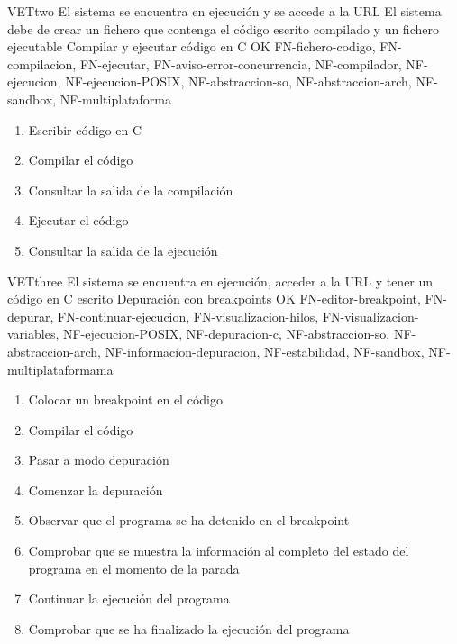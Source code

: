     \begin{testCase}{VET}{two}
        {El sistema se encuentra en ejecución y se accede a la URL}
        {El sistema debe de crear un fichero que contenga el código escrito compilado y un fichero ejecutable}
        {Compilar y ejecutar código en C}
        {OK}
        {FN-fichero-codigo, FN-compilacion, FN-ejecutar, FN-aviso-error-concurrencia, NF-compilador, NF-ejecucion, NF-ejecucion-POSIX, NF-abstraccion-so, NF-abstraccion-arch, NF-sandbox, NF-multiplataforma}
        \begin{enumerate}
            \item Escribir código en C
            \item Compilar el código
            \item Consultar la salida de la compilación
            \item Ejecutar el código
            \item Consultar la salida de la ejecución
        \end{enumerate}
    \end{testCase}

    \begin{testCase}{VET}{three}
        {El sistema se encuentra en ejecución, acceder a la URL y tener un código en C escrito}
        {\NA}
        {Depuración con breakpoints}
        {OK}
        {FN-editor-breakpoint, FN-depurar, FN-continuar-ejecucion, FN-visualizacion-hilos, FN-visualizacion-variables, NF-ejecucion-POSIX, NF-depuracion-c, NF-abstraccion-so, NF-abstraccion-arch, NF-informacion-depuracion, NF-estabilidad, NF-sandbox, NF-multiplataformama}
        \begin{enumerate}
            \item Colocar un breakpoint en el código
            \item Compilar el código
            \item Pasar a modo depuración
            \item Comenzar la depuración
            \item Observar que el programa se ha detenido en el breakpoint
            \item Comprobar que se muestra la información al completo del estado del programa en el momento de la parada
            \item Continuar la ejecución del programa
            \item Comprobar que se ha finalizado la ejecución del programa
        \end{enumerate}
    \end{testCase}

